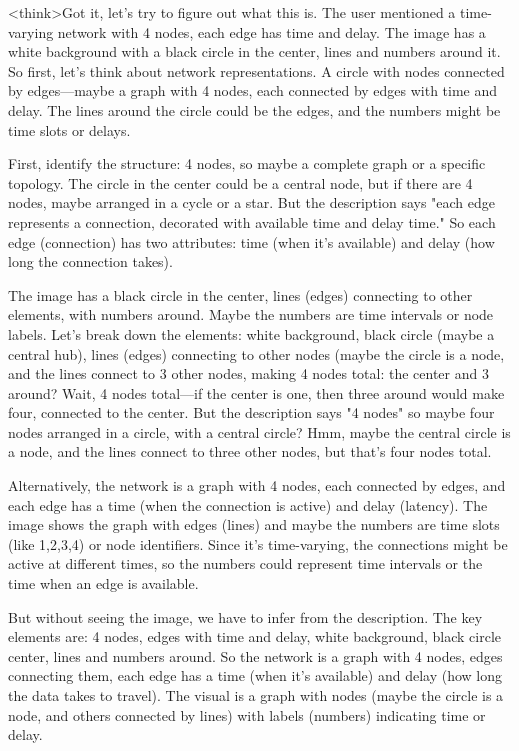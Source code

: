 <think>Got it, let's try to figure out what this is. The user mentioned a time-varying network with 4 nodes, each edge has time and delay. The image has a white background with a black circle in the center, lines and numbers around it. So first, let's think about network representations. A circle with nodes connected by edges—maybe a graph with 4 nodes, each connected by edges with time and delay. The lines around the circle could be the edges, and the numbers might be time slots or delays. 

First, identify the structure: 4 nodes, so maybe a complete graph or a specific topology. The circle in the center could be a central node, but if there are 4 nodes, maybe arranged in a cycle or a star. But the description says "each edge represents a connection, decorated with available time and delay time." So each edge (connection) has two attributes: time (when it's available) and delay (how long the connection takes). 

The image has a black circle in the center, lines (edges) connecting to other elements, with numbers around. Maybe the numbers are time intervals or node labels. Let's break down the elements: white background, black circle (maybe a central hub), lines (edges) connecting to other nodes (maybe the circle is a node, and the lines connect to 3 other nodes, making 4 nodes total: the center and 3 around? Wait, 4 nodes total—if the center is one, then three around would make four, connected to the center. But the description says "4 nodes" so maybe four nodes arranged in a circle, with a central circle? Hmm, maybe the central circle is a node, and the lines connect to three other nodes, but that's four nodes total. 

Alternatively, the network is a graph with 4 nodes, each connected by edges, and each edge has a time (when the connection is active) and delay (latency). The image shows the graph with edges (lines) and maybe the numbers are time slots (like 1,2,3,4) or node identifiers. Since it's time-varying, the connections might be active at different times, so the numbers could represent time intervals or the time when an edge is available. 

But without seeing the image, we have to infer from the description. The key elements are: 4 nodes, edges with time and delay, white background, black circle center, lines and numbers around. So the network is a graph with 4 nodes, edges connecting them, each edge has a time (when it's available) and delay (how long the data takes to travel). The visual is a graph with nodes (maybe the circle is a node, and others connected by lines) with labels (numbers) indicating time or delay. 

